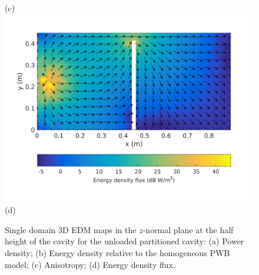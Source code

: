 \documentclass[a4paper]{article}
\numberwithin{equation}{section}
\begin{document}
\begin{figure}[hp]
\begin{center}
{\footnotesize (c)}\\
\vspace{2mm}
\includegraphics[trim={0 11mm 0 12mm},clip,width=0.52\linewidth]{figures/SDM_3D_DU_EnergyDensityFluxMap}\\
{\footnotesize (d)}\\
\vspace{-2mm}
\caption{\label{fg:partemptysdm_maps} Single domain 3D EDM maps in the $z$-normal plane at the half height of the cavity for the 
unloaded partitioned cavity: (a) Power density; (b) Energy density relative to the homogeneous PWB model;
(c) Anisotropy; (d) Energy density flux.}
\end{center}
\end{figure}
\end{document}
